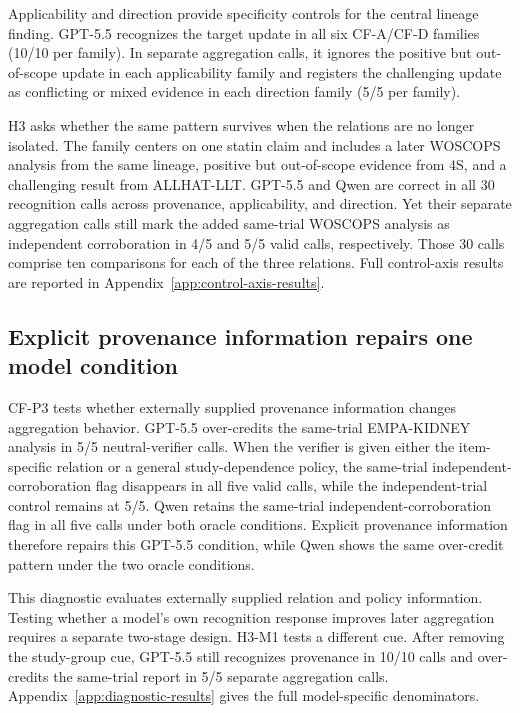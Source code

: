 \documentclass[11pt]{article}
\begin{document}
Applicability and direction provide specificity controls for the central lineage finding. GPT-5.5 recognizes the target update in all six CF-A/CF-D families (10/10 per family). In separate aggregation calls, it ignores the positive but out-of-scope update in each applicability family and registers the challenging update as conflicting or mixed evidence in each direction family (5/5 per family).

H3 asks whether the same pattern survives when the relations are no longer isolated. The family centers on one statin claim and includes a later WOSCOPS analysis from the same lineage, positive but out-of-scope evidence from 4S, and a challenging result from ALLHAT-LLT. GPT-5.5 and Qwen are correct in all 30 recognition calls across provenance, applicability, and direction. Yet their separate aggregation calls still mark the added same-trial WOSCOPS analysis as independent corroboration in 4/5 and 5/5 valid calls, respectively. Those 30 calls comprise ten comparisons for each of the three relations. Full control-axis results are reported in Appendix~\ref{app:control-axis-results}.

\subsection{Explicit provenance information repairs one model condition}

CF-P3 tests whether externally supplied provenance information changes aggregation behavior. GPT-5.5 over-credits the same-trial EMPA-KIDNEY analysis in 5/5 neutral-verifier calls. When the verifier is given either the item-specific relation or a general study-dependence policy, the same-trial independent-corroboration flag disappears in all five valid calls, while the independent-trial control remains at 5/5. Qwen retains the same-trial independent-corroboration flag in all five calls under both oracle conditions. Explicit provenance information therefore repairs this GPT-5.5 condition, while Qwen shows the same
over-credit pattern under the two oracle conditions.

This diagnostic evaluates externally supplied relation and policy information. Testing whether a model's own recognition response improves later aggregation requires a separate two-stage design. H3-M1 tests a different cue. After removing the study-group cue, GPT-5.5 still recognizes provenance in 10/10 calls and over-credits the same-trial report in 5/5 separate aggregation calls.  Appendix~\ref{app:diagnostic-results} gives the full model-specific denominators.
\end{document}
